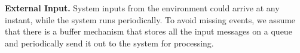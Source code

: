 
%				
%

%	
%

{\bf External Input.} 
System inputs from the environment could arrive at any instant, while the system runs periodically. To avoid missing events, we assume that there is a buffer mechanism that stores all the input messages on a queue and periodically send it out to the system for processing.%

%
%

